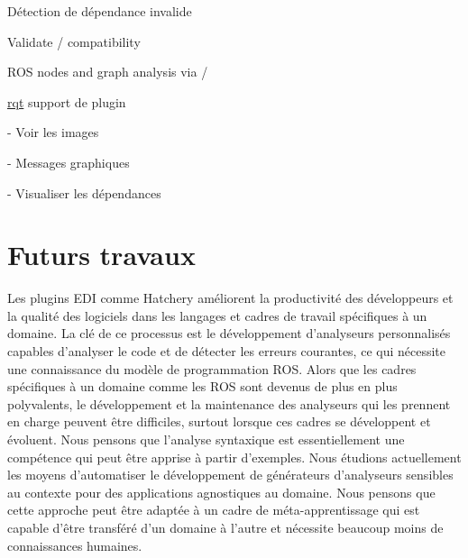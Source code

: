 \begin{multicols}{2}
\begin{todolist}
\begin{todolist}
\item Détection de dépendance invalide
\item Validate / compatibility
\item ROS nodes and graph analysis via \href{https://wiki.ros.org/rosdep}{}/\href{https://wiki.ros.org/rqt_dep}{}
\end{todolist}
\item[\done] \href{https://wiki.ros.org/rqt}{rqt} support de plugin
\begin{todolist}
\item[\done] \href{https://wiki.ros.org/rqt_image_view}{} - Voir les images
\item[\done] \href{https://wiki.ros.org/rqt_graph}{} - Messages graphiques
\item[\done] \href{https://wiki.ros.org/rqt_dep}{} - Visualiser les dépendances
\end{todolist}
\end{todolist}
\end{multicols}

\section{Futurs travaux}

Les plugins EDI comme Hatchery améliorent la productivité des développeurs et la qualité des logiciels dans les langages et cadres de travail spécifiques à un domaine. La clé de ce processus est le développement d'analyseurs personnalisés capables d'analyser le code et de détecter les erreurs courantes, ce qui nécessite une connaissance du modèle de programmation ROS. Alors que les cadres spécifiques à un domaine comme les ROS sont devenus de plus en plus polyvalents, le développement et la maintenance des analyseurs qui les prennent en charge peuvent être difficiles, surtout lorsque ces cadres se développent et évoluent. Nous pensons que l'analyse syntaxique est essentiellement une compétence qui peut être apprise à partir d'exemples. Nous étudions actuellement les moyens d'automatiser le développement de générateurs d'analyseurs sensibles au contexte pour des applications agnostiques au domaine. Nous pensons que cette approche peut être adaptée à un cadre de méta-apprentissage qui est capable d'être transféré d'un domaine à l'autre et nécessite beaucoup moins de connaissances humaines.

